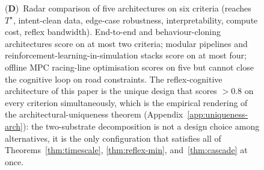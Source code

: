 \begin{figure}[!htbp]
{    (\textbf{D})~Radar comparison of five architectures on six criteria (reaches $T^\star$, intent-clean data, edge-case robustness, interpretability, compute cost, reflex bandwidth). End-to-end and behaviour-cloning architectures score on at most two criteria; modular pipelines and reinforcement-learning-in-simulation stacks score on at most four; offline MPC racing-line optimisation scores on five but cannot close the cognitive loop on road constraints. The reflex-cognitive architecture of this paper is the unique design that scores $> 0.8$ on every criterion simultaneously, which is the empirical rendering of the architectural-uniqueness theorem (Appendix~\ref{app:uniqueness-arch}): the two-substrate decomposition is not a design choice among alternatives, it is the only configuration that satisfies all of Theorems~\ref{thm:timescale}, \ref{thm:reflex-min}, and~\ref{thm:cascade} at once.}
    \label{fig:panel5}
\end{figure}
